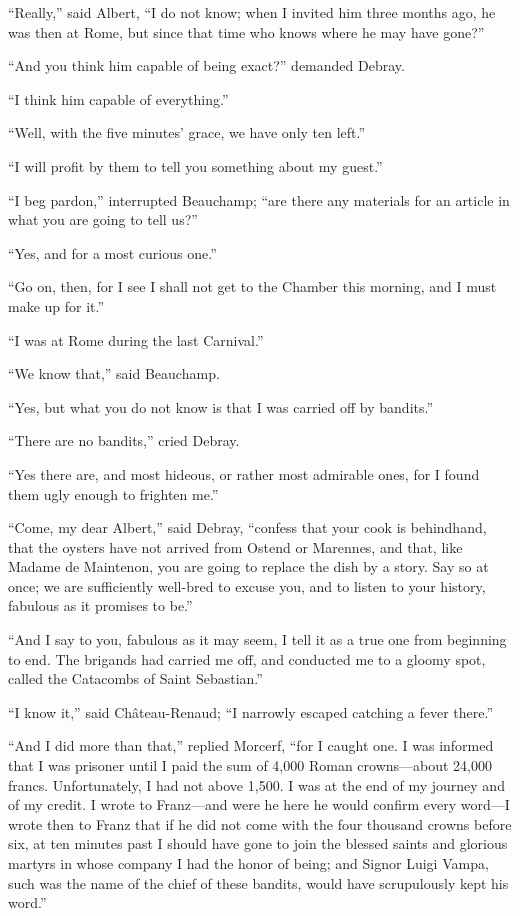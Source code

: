 “Really,” said Albert, “I do not know; when I invited him three months
ago, he was then at Rome, but since that time who knows where he may
have gone?”

“And you think him capable of being exact?” demanded Debray.

“I think him capable of everything.”

“Well, with the five minutes’ grace, we have only ten left.”

“I will profit by them to tell you something about my guest.”

“I beg pardon,” interrupted Beauchamp; “are there any materials for an
article in what you are going to tell us?”

“Yes, and for a most curious one.”

“Go on, then, for I see I shall not get to the Chamber this morning,
and I must make up for it.”

“I was at Rome during the last Carnival.”

“We know that,” said Beauchamp.

“Yes, but what you do not know is that I was carried off by bandits.”

“There are no bandits,” cried Debray.

“Yes there are, and most hideous, or rather most admirable ones, for I
found them ugly enough to frighten me.”

“Come, my dear Albert,” said Debray, “confess that your cook is
behindhand, that the oysters have not arrived from Ostend or Marennes,
and that, like Madame de Maintenon, you are going to replace the dish
by a story. Say so at once; we are sufficiently well-bred to excuse
you, and to listen to your history, fabulous as it promises to be.”

“And I say to you, fabulous as it may seem, I tell it as a true one
from beginning to end. The brigands had carried me off, and conducted
me to a gloomy spot, called the Catacombs of Saint Sebastian.”

“I know it,” said Château-Renaud; “I narrowly escaped catching a fever
there.”

“And I did more than that,” replied Morcerf, “for I caught one. I was
informed that I was prisoner until I paid the sum of 4,000 Roman
crowns—about 24,000 francs. Unfortunately, I had not above 1,500. I was
at the end of my journey and of my credit. I wrote to Franz—and were he
here he would confirm every word—I wrote then to Franz that if he did
not come with the four thousand crowns before six, at ten minutes past
I should have gone to join the blessed saints and glorious martyrs in
whose company I had the honor of being; and Signor Luigi Vampa, such
was the name of the chief of these bandits, would have scrupulously
kept his word.”

